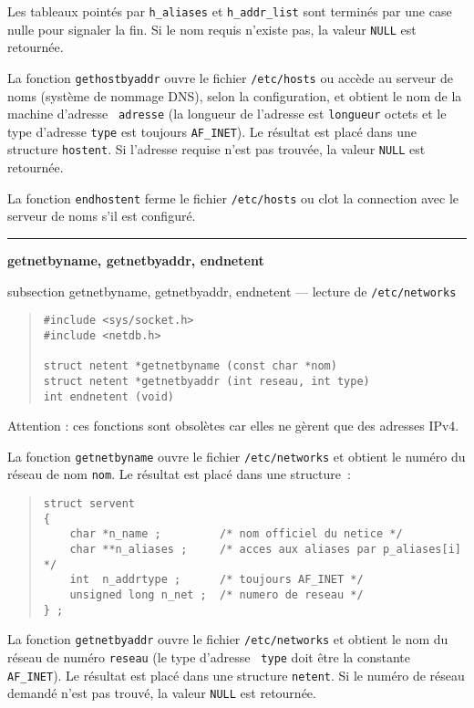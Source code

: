 \documentclass [twoside] {report}
\newcommand {\primitive} [1]
    {
	{\large \bf #1}
	\addcontentsline {toc} {subsection} {#1}
    }
\newcommand {\separation}
    {
	\vspace {7mm}
	\nopagebreak
	\hrule
    }
\begin{document}
Les tableaux pointés par {\tt h\_aliases} et {\tt h\_addr\_list} sont
terminés par une case nulle pour signaler la fin. Si le nom requis
n'existe pas, la valeur {\tt NULL} est retournée.

La fonction {\tt gethostbyaddr} ouvre le fichier {\tt /etc/hosts} ou
accède au serveur de noms (système de nommage DNS), selon la
configuration, et obtient le nom de la machine d'adresse {\tt
adresse} (la longueur de l'adresse est {\tt longueur} octets et le
type d'adresse {\tt type} est toujours {\tt AF\_INET}). Le résultat
est placé dans une structure {\tt hostent}. Si l'adresse requise
n'est pas trouvée, la valeur {\tt NULL} est retournée.

La fonction {\tt endhostent} ferme le fichier {\tt /etc/hosts} ou clot
la connection avec le serveur de noms s'il est configuré.


\separation
\primitive {getnetbyname, getnetbyaddr,
endnetent} --- lecture de {\tt /etc/networks}

\begin {quote}
\begin {verbatim}
#include <sys/socket.h>
#include <netdb.h>

struct netent *getnetbyname (const char *nom)
struct netent *getnetbyaddr (int reseau, int type)
int endnetent (void)
\end{verbatim}
\end {quote}

Attention : ces fonctions sont obsolètes car elles ne gèrent que
des adresses IPv4.

La fonction {\tt getnetbyname} ouvre le fichier {\tt /etc/networks} et
obtient le numéro du réseau de nom {\tt nom}.  Le résultat est placé
dans une structure~:

\begin {quote}
    \small
\begin {verbatim}
struct servent
{
    char *n_name ;         /* nom officiel du netice */
    char **n_aliases ;     /* acces aux aliases par p_aliases[i] */
    int  n_addrtype ;      /* toujours AF_INET */
    unsigned long n_net ;  /* numero de reseau */
} ;
\end{verbatim}
\end {quote}

La fonction {\tt getnetbyaddr} ouvre le fichier {\tt /etc/networks} et
obtient le nom du réseau de numéro {\tt reseau} (le type d'adresse {\tt
type} doit être la constante {\tt AF\_INET}).  Le résultat est placé
dans une structure {\tt netent}.  Si le numéro de réseau demandé n'est
pas trouvé, la valeur {\tt NULL} est retournée.
\end{document}
